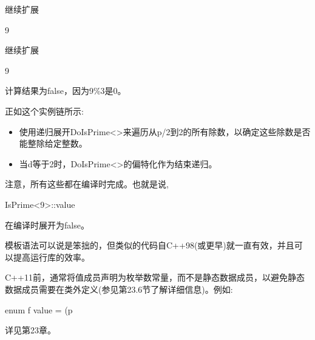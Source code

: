 继续扩展

\begin{cpp}
9%
\end{cpp}

继续扩展

\begin{cpp}
9%
\end{cpp}

计算结果为false，因为9\%3是0。

正如这个实例链所示:

\begin{itemize}
\item 
使用递归展开DoIsPrime<>来遍历从p/2到2的所有除数，以确定这些除数是否能整除给定整数。

\item 
当d等于2时，DoIsPrime<>的偏特化作为结束递归。
\end{itemize}

注意，所有这些都在编译时完成。也就是说,

\begin{cpp}
IsPrime<9>::value
\end{cpp}

在编译时展开为false。

模板语法可以说是笨拙的，但类似的代码自C++98(或更早)就一直有效，并且可以提高运行库的效率。

\begin{notice}
C++11前，通常将值成员声明为枚举数常量，而不是静态数据成员，以避免静态数据成员需要在类外定义(参见第23.6节了解详细信息)。例如:
\begin{cpp}
enum f value = (p%
\end{cpp}
\end{notice}

详见第23章。


























